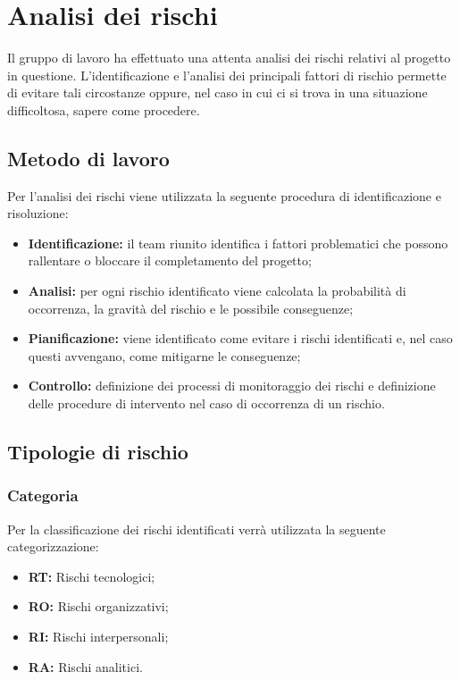 \section{Analisi dei rischi}

Il gruppo di lavoro ha effettuato una attenta analisi dei rischi relativi al progetto in questione. L'identificazione e l'analisi dei principali fattori di rischio permette di evitare tali circostanze oppure, nel caso in cui ci si trova in una situazione difficoltosa, sapere come procedere.

\subsection{Metodo di lavoro}
Per l'analisi dei rischi viene utilizzata la seguente procedura di identificazione e risoluzione:
\begin{itemize}
	\item \textbf{Identificazione:} il team riunito identifica i fattori problematici che possono rallentare o bloccare il completamento del progetto;
	\item \textbf{Analisi:} per ogni rischio identificato viene calcolata la probabilità di occorrenza, la gravità del rischio e le possibile conseguenze;
	\item \textbf{Pianificazione:} viene identificato come evitare i rischi identificati e, nel caso questi avvengano, come mitigarne le conseguenze;
	\item \textbf{Controllo:} definizione dei processi di monitoraggio dei rischi e definizione delle procedure di intervento nel caso di occorrenza di un rischio.
\end{itemize}


\subsection{Tipologie di rischio}
\subsubsection{Categoria}
Per la classificazione dei rischi identificati verrà utilizzata la seguente categorizzazione:
\begin{itemize}
	\item \textbf{RT:} Rischi tecnologici;
	\item \textbf{RO:} Rischi organizzativi;
	\item \textbf{RI:} Rischi interpersonali;
	\item \textbf{RA:} Rischi analitici.
\end{itemize}
